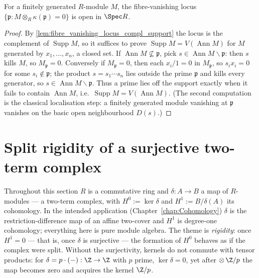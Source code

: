 \begin{theorem}
  \label{thm:isOpen_fibre_vanishing}
  \leanok
  For a finitely generated \(R\)-module \(M\), the fibre-vanishing locus
  \(\{\mathfrak p : M \otimes_R \kappa(\mathfrak p) = 0\}\) is open in \(\Spec R\).
\end{theorem}
\begin{proof}
  \leanok
  By \ref{lem:fibre_vanishing_locus_compl_support} the locus is the complement of
  \(\operatorname{Supp} M\), so it suffices to prove
  \(\operatorname{Supp} M = V(\operatorname{Ann} M)\) for \(M\) generated by
  \(x_1, \dots, x_n\), a closed set. If
  \(\operatorname{Ann} M \not\subseteq \mathfrak p\), pick
  \(s \in \operatorname{Ann} M \smallsetminus \mathfrak p\): then \(s\) kills \(M\), so
  \(M_{\mathfrak p} = 0\). Conversely if \(M_{\mathfrak p} = 0\), then each
  \(x_i/1 = 0\) in \(M_{\mathfrak p}\), so \(s_i x_i = 0\) for some
  \(s_i \notin \mathfrak p\); the product \(s = s_1 \cdots s_n\) lies outside the prime
  \(\mathfrak p\) and kills every generator, so
  \(s \in \operatorname{Ann} M \smallsetminus \mathfrak p\). Thus a prime lies off the
  support exactly when it fails to contain \(\operatorname{Ann} M\), i.e.\
  \(\operatorname{Supp} M = V(\operatorname{Ann} M)\). (The second computation is the
  classical localisation step: a finitely generated module vanishing at \(\mathfrak p\)
  vanishes on the basic open neighbourhood \(D(s)\).)
\end{proof}

\section{Split rigidity of a surjective two-term complex}
\label{sec:split_rigidity}

Throughout this section \(R\) is a commutative ring and \(\delta : A \to B\) a map of
\(R\)-modules --- a two-term complex, with
\(H^0 := \ker \delta\) and \(H^1 := B/\delta(A)\) its cohomology. In the intended
application (Chapter~\ref{chap:Cohomology}) \(\delta\) is the restriction-difference map
of an affine two-cover and \(H^1\) is degree-one cohomology; everything here is pure
module algebra. The theme is \emph{rigidity}: once \(H^1 = 0\) --- that is, once
\(\delta\) is surjective --- the formation of \(H^0\) behaves as if the complex were
split. Without the surjectivity, kernels do not commute with tensor products: for
\(\delta = p \cdot (-) : \Z \to \Z\) with \(p\) prime, \(\ker \delta = 0\), yet after
\(\otimes\, \Z/p\) the map becomes zero and acquires the kernel \(\Z/p\).

